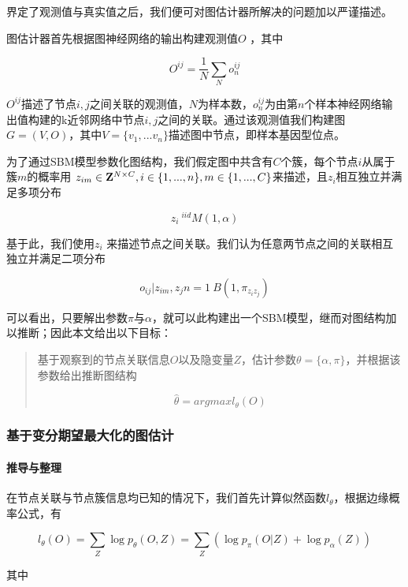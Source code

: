 \documentclass[
]{article}
\begin{document}
界定了观测值与真实值之后，我们便可对图估计器所解决的问题加以严谨描述。

图估计器首先根据图神经网络的输出构建观测值\( O\) ，其中

\[O^{ij}=\frac{1}{N}\sum_N o^{ij}_n\]

\(O^{ij}\)描述了节点\(i,j\)之间关联的观测值，\(N\)为样本数，\(o^{ij}_n\)为由第\(n\)个样本神经网络输出值构建的k近邻网络中节点\(i,j\)之间的关联。通过该观测值我们构建图
\(G=(V,O)\)，其中\(V=\{v_1,...v_n\}\)描述图中节点，即样本基因型位点。

为了通过SBM模型参数化图结构，我们假定图中共含有\(C\)个簇，每个节点\(i\)从属于簇\(m\)的概率用
\(z_{im}\in \bold{Z}^{N\times C},i\in \{1, ... ,n\},m\in\{1,...,C\}\)来描述，且\(z_i\)相互独立并满足多项分布

\[z_i ~^{iid} M(1,\alpha)\]

基于此，我们使用\(z_i\)
来描述节点之间关联。我们认为任意两节点之间的关联相互独立并满足二项分布

\[o_{ij}|z_{im},z_jn = 1 ~ B(1,\pi_{z_iz_j})\]

可以看出，只要解出参数\(\pi\)与\(\alpha\)，就可以此构建出一个SBM模型，继而对图结构加以推断；因此本文给出以下目标：

\begin{quote}
基于观察到的节点关联信息\(O\)以及隐变量\(Z\)，估计参数\(\theta=\{\alpha,\pi\}\)，并根据该参数给出推断图结构

\[\hat{\theta}=argmax l_\theta(O)\]
\end{quote}

\hypertarget{ux57faux4e8eux53d8ux5206ux671fux671bux6700ux5927ux5316ux7684ux56feux4f30ux8ba1}{%
\subsubsection{基于变分期望最大化的图估计}\label{ux57faux4e8eux53d8ux5206ux671fux671bux6700ux5927ux5316ux7684ux56feux4f30ux8ba1}}

\hypertarget{ux63a8ux5bfcux4e0eux6574ux7406}{%
\paragraph{推导与整理}\label{ux63a8ux5bfcux4e0eux6574ux7406}}

在节点关联与节点簇信息均已知的情况下，我们首先计算似然函数\(l_{\theta}\)，根据边缘概率公式，有

\[l_\theta(O)=\sum_{Z}\log p_\theta(O,Z)=\sum_Z(\log p_{\pi}(O|Z)
+\log p_\alpha(Z))\]

其中
\end{document}
